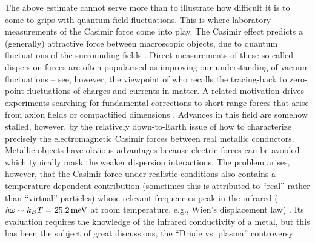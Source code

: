 \documentclass[11pt, oneside]{article}   	%
\begin{document}
The above estimate cannot serve more than to illustrate how difficult it is to come to
grips with quantum field fluctuations. This is where laboratory measurements of the Casimir
force come into play. 
The Casimir effect predicts a (generally) attractive force between macroscopic objects,
due to quantum fluctuations of the surrounding fields
\citep{Casimir_1948b, Sernelius_2018book}. Direct measurements of these so-called dispersion forces
are often popularised as improving our
understanding of vacuum fluctuations -- see, however, the viewpoint of \citet{Jaffe_2005} who
recalls the tracing-back to zero-point fluctuations of charges and currents in matter.
A related motivation drives experiments searching for
fundamental corrections to short-range forces that arise
from axion fields or compactified dimensions \citep{Chen_2016b, Klimchitskaya_2021}.
Advances in this field are somehow stalled, however, by the relatively 
down-to-Earth issue of how to characterize precisely the electromagnetic Casimir forces 
between real metallic conductors. Metallic objects have obvious advantages because electric
forces can be avoided which typically mask the weaker dispersion interactions. The problem
arises, however, that the Casimir force under realistic conditions also contains a 
temperature-dependent contribution (sometimes this is attributed to ``real'' rather than
``virtual'' particles) whose relevant frequencies peak in the infrared 
($\hbar \omega \sim k_B T = 25.2\,{\rm meV}$ at room temperature, e.g., Wien's displacement law)
\citep{Torgerson_2004, Bimonte_2009b}.
Its evaluation requires the knowledge of the infrared conductivity of a metal,
but this has been the subject of great discussions, 
the ``Drude vs. plasma'' controversy \citep{Mostepanenko_2015, Henkel_2020a, Reiche_2020a, Klimchitskaya_2020b, Klimchitskaya_2020a}.
\end{document}

